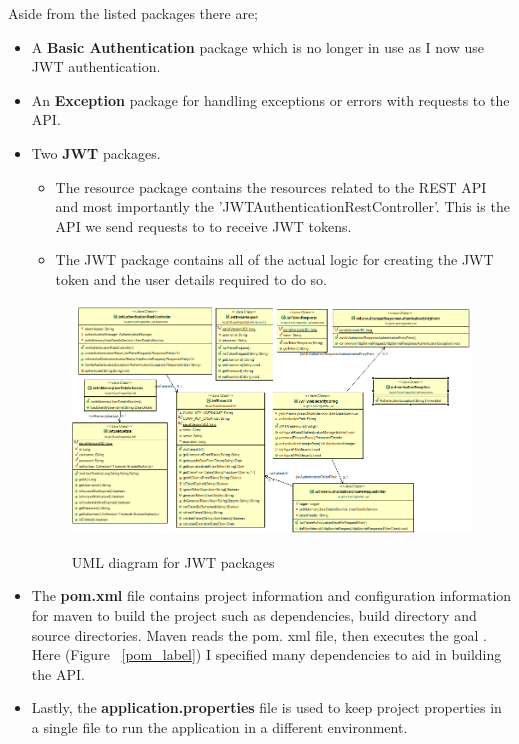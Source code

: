 Aside from the listed packages there are;
\begin{itemize}
    \item A \textbf{Basic Authentication} package which is no longer in use as I now use JWT authentication.
    \item An \textbf{Exception} package for handling exceptions or errors with requests to the API.
    \item Two \textbf{JWT} packages.
        \begin{itemize}
            \item The resource package contains the resources related to the REST API and most importantly the 'JWTAuthenticationRestController'. This is the API we send requests to to receive JWT tokens.
            \item The JWT package contains all of the actual logic for creating the JWT token and the user details required to do so.
        \end{itemize}
        \begin{figure}[ht]
        \centering
        \includegraphics[scale=0.4]{Images/JWT UML.png} 
        \label{jwtuml_label}
        \caption{UML diagram for JWT packages}
        \end{figure}
        \item The \textbf{pom.xml} file contains project information and configuration information for maven to build the project such as dependencies, build directory and source directories. Maven reads the pom. xml file, then executes the goal \cite{POM}. Here (Figure ~\ref{pom_label}) I specified many dependencies to aid in building the API.
        \item Lastly, the \textbf{application.properties} file is used to keep project properties in a single file to run the application in a different environment.
\end{itemize}
